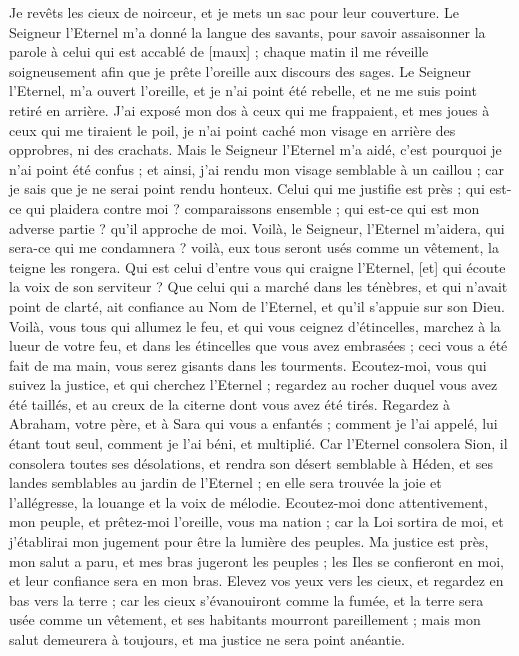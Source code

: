 \begin{multicols}{2}
Je revêts les cieux de noirceur, et je mets un sac pour leur couverture.
Le Seigneur l'Eternel m'a donné la langue des savants, pour savoir assaisonner la parole à celui qui est accablé de [maux] ; chaque matin il me réveille soigneusement afin que je prête l'oreille aux discours des sages.
Le Seigneur l'Eternel, m'a ouvert l'oreille, et je n'ai point été rebelle, et ne me suis point retiré en arrière.
J'ai exposé mon dos à ceux qui me frappaient, et mes joues à ceux qui me tiraient le poil, je n'ai point caché mon visage en arrière des opprobres, ni des crachats.
Mais le Seigneur l'Eternel m'a aidé, c'est pourquoi je n'ai point été confus ; et ainsi, j'ai rendu mon visage semblable à un caillou ; car je sais que je ne serai point rendu honteux.
Celui qui me justifie est près ; qui est-ce qui plaidera contre moi ? comparaissons ensemble ; qui est-ce qui est mon adverse partie ? qu'il approche de moi.
Voilà, le Seigneur, l'Eternel m'aidera, qui sera-ce qui me condamnera ? voilà, eux tous seront usés comme un vêtement, la teigne les rongera.
Qui est celui d'entre vous qui craigne l'Eternel, [et] qui écoute la voix de son serviteur ? Que celui qui a marché dans les ténèbres, et qui n'avait point de clarté, ait confiance au Nom de l'Eternel, et qu'il s'appuie sur son Dieu.
Voilà, vous tous qui allumez le feu, et qui vous ceignez d'étincelles, marchez à la lueur de votre feu, et dans les étincelles que vous avez embrasées ; ceci vous a été fait de ma main, vous serez gisants dans les tourments.
\VerseOne{}Ecoutez-moi, vous qui suivez la justice, et qui cherchez l'Eternel ; regardez au rocher duquel vous avez été taillés, et au creux de la citerne dont vous avez été tirés.
Regardez à Abraham, votre père, et à Sara qui vous a enfantés ; comment je l'ai appelé, lui étant tout seul, comment je l'ai béni, et multiplié.
Car l'Eternel consolera Sion, il consolera toutes ses désolations, et rendra son désert semblable à Héden, et ses landes semblables au jardin de l'Eternel ; en elle sera trouvée la joie et l'allégresse, la louange et la voix de mélodie.
Ecoutez-moi donc attentivement, mon peuple, et prêtez-moi l'oreille, vous ma nation ; car la Loi sortira de moi, et j'établirai mon jugement pour être la lumière des peuples.
Ma justice est près, mon salut a paru, et mes bras jugeront les peuples ; les Iles se confieront en moi, et leur confiance sera en mon bras.
Elevez vos yeux vers les cieux, et regardez en bas vers la terre ; car les cieux s'évanouiront comme la fumée, et la terre sera usée comme un vêtement, et ses habitants mourront pareillement ; mais mon salut demeurera à toujours, et ma justice ne sera point anéantie.

\end{multicols}
